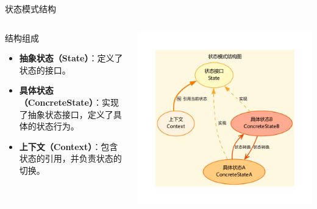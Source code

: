 \documentclass[UTF8,aspectratio=169]{beamer}
\begin{document}
\begin{frame}{状态模式结构}
    \begin{columns}
        \begin{column}{0.48\textwidth}
            \begin{ytublock}{结构组成}
                \begin{itemize}
                    \item \textbf{抽象状态（State）}：定义了状态的接口。
                    \item \textbf{具体状态（ConcreteState）}：实现了抽象状态接口，定义了具体的状态行为。
                    \item \textbf{上下文（Context）}：包含状态的引用，并负责状态的切换。
                \end{itemize}
            \end{ytublock}
        \end{column}
        \begin{column}{0.48\textwidth}
            \begin{center}
                \includegraphics[width=1.0\textwidth]{images/state_pattern.pdf}
            \end{center}
        \end{column}
    \end{columns}
\end{frame}
\end{document}

